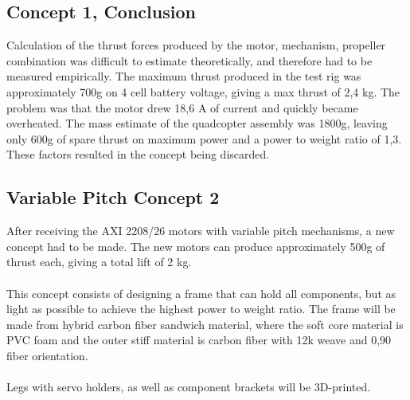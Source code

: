 \subsection{Concept 1, Conclusion}

Calculation of the thrust forces produced by the motor, mechanism, propeller combination was difficult to estimate theoretically, and therefore had to be measured empirically. The maximum thrust produced in the test rig was approximately 700g on 4 cell battery voltage, giving a max thrust of 2,4 kg. The problem was that the motor drew 18,6 A of current and quickly became overheated. The mass estimate of the quadcopter assembly was 1800g, leaving only 600g of spare thrust on maximum power and a power to weight ratio of 1,3. These factors resulted in the concept being discarded.

\subsection{Variable Pitch Concept 2}

After receiving the AXI 2208/26 motors with variable pitch mechanisms, a new concept had to be made. The new motors can produce approximately 500g of thrust each, giving a total lift of 2 kg.
\\\\
This concept consists of designing a frame that can hold all components, but as light as possible to achieve the highest power to weight ratio. The frame will be made from hybrid carbon fiber sandwich material, where the soft core material is PVC foam and the outer stiff material is carbon fiber with 12k weave and 0,90 fiber orientation.
\\\\
Legs with servo holders, as well as component brackets will be 3D-printed.

